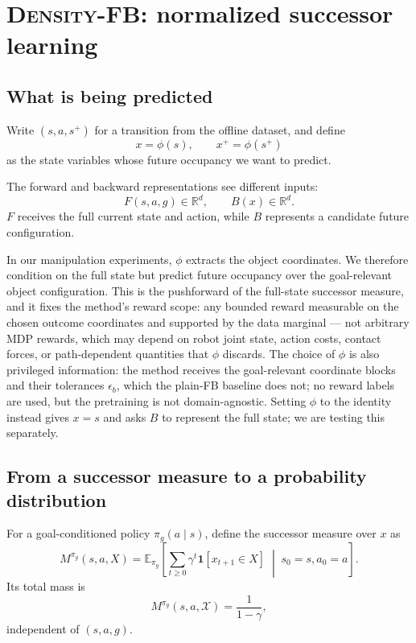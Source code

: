 \documentclass{article}
\newcommand{\E}{\mathbb{E}}
\newcommand{\ind}[1]{\mathbf{1}\!\left[#1\right]}
\newcommand{\DensityFB}{\textsc{Density-FB}}
\begin{document}
\section{\DensityFB: normalized successor learning}
\label{sec:method}

\subsection{What is being predicted}

Write \( (s,a,s^+) \) for a transition from the offline dataset, and define
\begin{equation}
x=\phi(s), \qquad x^+=\phi(s^+)
\end{equation}
as the state variables whose future occupancy we want to predict.

The forward and backward representations see different inputs:
\begin{equation}
\label{eq:fb-args}
F(s,a,g)\in\mathbb R^d, \qquad B(x)\in\mathbb R^d.
\end{equation}
$F$ receives the full current state and action, while $B$ represents a candidate future configuration.

In our manipulation experiments, $\phi$ extracts the object coordinates.
We therefore condition on the full state but predict future occupancy over the goal-relevant object configuration.
This is the pushforward of the full-state successor measure, and it fixes the method's reward scope: any bounded reward measurable on the chosen outcome coordinates and supported by the data marginal --- not arbitrary MDP rewards, which may depend on robot joint state, action costs, contact forces, or path-dependent quantities that $\phi$ discards.
The choice of $\phi$ is also privileged information: the method receives the goal-relevant coordinate blocks and their tolerances $\epsilon_b$, which the plain-FB baseline does not; no reward labels are used, but the pretraining is not domain-agnostic.
Setting $\phi$ to the identity instead gives $x=s$ and asks $B$ to represent the full state; we are testing this separately.

\subsection{From a successor measure to a probability distribution}

For a goal-conditioned policy $\pi_g(a\mid s)$, define the successor measure over $x$ as
\begin{equation}
    M^{\pi_g}(s,a,X) = \E_{\pi_g} \left[ \sum_{t\ge0} \gamma^t \ind{x_{t+1}\in X} \;\middle|\; s_0=s,a_0=a \right].
\end{equation}
Its total mass is
\begin{equation}
    M^{\pi_g}(s,a,\mathcal X) = \frac{1}{1-\gamma},
\end{equation}
independent of $(s,a,g)$.
\end{document}
